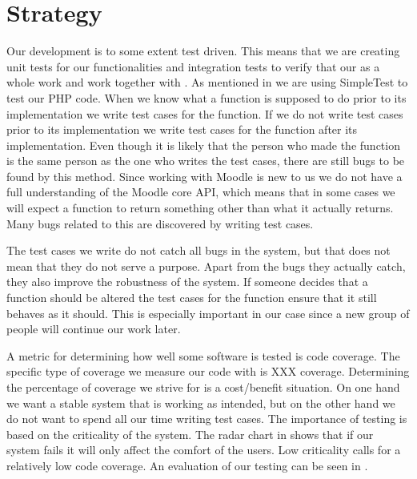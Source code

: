 \section{Strategy}
\label{sec:strategy}
Our development is to some extent test driven.
This means that we are creating unit tests for our functionalities and integration tests to verify that our \subsystem{} as a whole work and work together with \moodle{}.
As mentioned in  we are using SimpleTest to test our PHP code.
When we know what a function is supposed to do prior to its implementation we write test cases for the function.
If we do not write test cases prior to its implementation we write test cases for the function after its implementation.
Even though it is likely that the person who made the function is the same person as the one who writes the test cases, there are still bugs to be found by this method.
Since working with Moodle is new to us we do not have a full understanding of the Moodle core API, which means that in some cases we will expect a function to return something other than what it actually returns.
Many bugs related to this are discovered by writing test cases.

The test cases we write do not catch all bugs in the system, but that does not mean that they do not serve a purpose.
Apart from the bugs they actually catch, they also improve the robustness of the system.
If someone decides that a function should be altered the test cases for the function ensure that it still behaves as it should.
This is especially important in our case since a new group of people will continue our work later.

A metric for determining how well some software is tested is code coverage. 
The specific type of coverage we measure our code with is XXX coverage. 
Determining the percentage of coverage we strive for is a cost/benefit situation.
On one hand we want a stable system that is working as intended, but on the other hand we do not want to spend all our time writing test cases.
The importance of testing is based on the criticality of the system.
The radar chart in  shows that if our system fails it will only affect the comfort of the users.
Low criticality calls for a relatively low code coverage.
An evaluation of our testing can be seen in .

